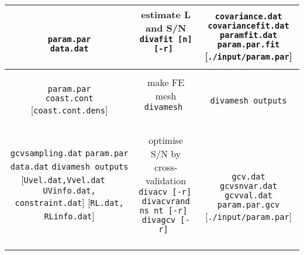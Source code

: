 \begin{table}
\begin{center}
{{\begin{tabular}{c|c|c}
 \shortstack{
 {  { }  } \\
{\tt param.par} \\
{\tt data.dat} \\
{  { }  } 
}
 & 
\shortstack{
{\sf estimate L and S/N} \\
{\tt divafit [n] [-r]  } 
\\
{  { }  } \\
{  { }  }
}
& 
\shortstack{
{\tt covariance.dat} \\
{\tt covariancefit.dat} \\
{\tt paramfit.dat} \\
{\tt param.par.fit} {  { }  } [{\tt ./input/param.par}]
}
\\ \hline
 \shortstack{
 {  { }  } \\
{\tt param.par} \\
{\tt coast.cont} \\
{ [{\tt coast.cont.dens}]  } 
}
 & 
\shortstack{
{\sf make FE mesh} \\
{\tt divamesh    } 
\\
{  { }  }
}
& 
\shortstack{
{  { }  } \\
{\tt divamesh outputs} \\
{  { }  } 
} 
\\ \hline
 \shortstack{
 {\tt gcvsampling.dat} \\
 {\tt param.par} \\
 {\tt data.dat} \\
 {\tt divamesh outputs} \\
 {[{\tt Uvel.dat,Vvel.dat}} \\
 { $\quad ${\tt UVinfo.dat, constraint.dat}]} \\
 {[{\tt RL.dat, RLinfo.dat}]} 
 }
 & 
\shortstack{
{  { }  } \\
{\sf optimise S/N by cross-validation} \\
{\tt divacv [-r]   } \\
{\tt divacvrand ns nt [-r] }  \\
{\tt divagcv [-r]   } \\
{  { }  } \\
{  { }  }
}
& 
\shortstack{
{  { }  } \\
{  { }  } \\
{\tt gcv.dat} \\
{\tt gcvsnvar.dat} \\
{\tt gcvval.dat} \\
{\tt param.par.gcv} {[{\tt ./input/param.par}] } \\
{  { }  } 
} 
\\ \hline

\end{tabular}}}
\end{center}
\end{table}
